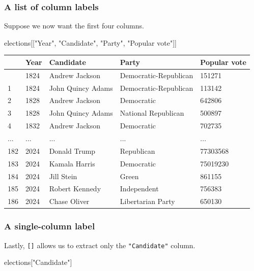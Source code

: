 \documentclass[
  letterpaper,
  DIV=11,
  numbers=noendperiod]{scrreprt}
\newenvironment{Shaded}{\begin{snugshade}}{\end{snugshade}}
\newcommand{\NormalTok}[1]{\textcolor[rgb]{0.00,0.23,0.31}{#1}}
\newcommand{\StringTok}[1]{\textcolor[rgb]{0.13,0.47,0.30}{#1}}
\begin{document}
\subsubsection{A list of column labels}\label{a-list-of-column-labels}

Suppose we now want the first four columns.

\begin{Shaded}
\begin{Highlighting}[]
\NormalTok{elections[[}\StringTok{"Year"}\NormalTok{, }\StringTok{"Candidate"}\NormalTok{, }\StringTok{"Party"}\NormalTok{, }\StringTok{"Popular vote"}\NormalTok{]]}
\end{Highlighting}
\end{Shaded}

\begin{longtable}[]{@{}lllll@{}}
\toprule\noalign{}
& Year & Candidate & Party & Popular vote \\
\midrule\noalign{}
\endhead
\bottomrule\noalign{}
\endlastfoot
0 & 1824 & Andrew Jackson & Democratic-Republican & 151271 \\
1 & 1824 & John Quincy Adams & Democratic-Republican & 113142 \\
2 & 1828 & Andrew Jackson & Democratic & 642806 \\
3 & 1828 & John Quincy Adams & National Republican & 500897 \\
4 & 1832 & Andrew Jackson & Democratic & 702735 \\
... & ... & ... & ... & ... \\
182 & 2024 & Donald Trump & Republican & 77303568 \\
183 & 2024 & Kamala Harris & Democratic & 75019230 \\
184 & 2024 & Jill Stein & Green & 861155 \\
185 & 2024 & Robert Kennedy & Independent & 756383 \\
186 & 2024 & Chase Oliver & Libertarian Party & 650130 \\
\end{longtable}

\subsubsection{A single-column label}\label{a-single-column-label}

Lastly, \texttt{{[}{]}} allows us to extract only the
\texttt{"Candidate"} column.

\begin{Shaded}
\begin{Highlighting}[]
\NormalTok{elections[}\StringTok{"Candidate"}\NormalTok{]}
\end{Highlighting}
\end{Shaded}
\end{document}

